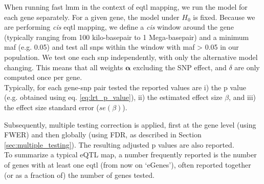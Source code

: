 When running fast \gls{lmm} in the context of \gls{eqtl} mapping, we run the model for each gene separately.
For a given gene, the model under $H_0$ is fixed.
Because we are performing \textit{cis} \gls{eqtl} mapping, we define a \textit{cis} window around the gene (typically ranging from 100 kilo-basepair to 1 Mega-basepair) and a minimum \gls{maf} (e.g. 0.05) and test all \gls{snp}s within the window with \gls{maf} > 0.05 in our population.  
We test one each \gls{snp} independently, with only the alternative model changing.
This means that all weights $\boldsymbol{\alpha}$ excluding the SNP effect, and $\delta$ are only computed once per gene.\\

Typically, for each gene-\gls{snp} pair tested the reported values are i) the p value (e.g. obtained using eq. \eqref{eq:lrt_p_value}), ii) the estimated effect size $\beta$, and iii) the effect size standard error ($se(\beta)$).


Subsequently, multiple testing correction is applied, first at the gene level (using FWER) and then globally (using FDR, as described in Section \ref{sec:multiple_testing}).
The resulting adjusted p values are also reported.\\

To summarize a typical eQTL map, a number frequently reported is the number of genes with at least one \gls{eqtl} (from now on `eGenes'), often reported together (or as a fraction of) the number of genes tested. \\








